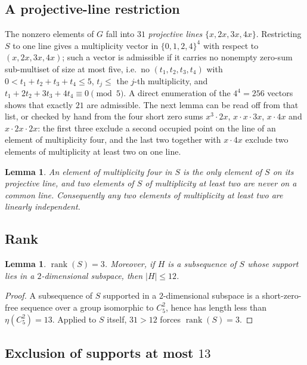 \documentclass[11pt]{article}
\newtheorem{lemma}[theorem]{Lemma}
\theoremstyle{definition}
\theoremstyle{remark}
\newcommand{\rank}{\operatorname{rank}}
\begin{document}
\subsection{A projective-line restriction}

The nonzero elements of $G$ fall into $31$ \emph{projective lines} $\{x,2x,3x,4x\}$. Restricting $S$ to one line gives a multiplicity vector in $\{0,1,2,4\}^4$ with respect to $(x,2x,3x,4x)$; such a vector is admissible if it carries no nonempty zero-sum sub-multiset of size at most five, i.e.\ no $(t_1,t_2,t_3,t_4)$ with $0<t_1+t_2+t_3+t_4\le5$, $t_j\le$ the $j$-th multiplicity, and $t_1+2t_2+3t_3+4t_4\equiv0\pmod5$. A direct enumeration of the $4^4=256$ vectors shows that exactly $21$ are admissible. The next lemma can be read off from that list, or checked by hand from the four short zero sums $x^3\cdot2x$, $x\cdot x\cdot3x$, $x\cdot4x$ and $x\cdot2x\cdot2x$: the first three exclude a second occupied point on the line of an element of multiplicity four, and the last two together with $x\cdot4x$ exclude two elements of multiplicity at least two on one line.

\begin{lemma}\label{lem:line}
An element of multiplicity four in $S$ is the only element of $S$ on its projective line, and two elements of $S$ of multiplicity at least two are never on a common line. Consequently any two elements of multiplicity at least two are linearly independent.
\end{lemma}

\subsection{Rank}

\begin{lemma}\label{lem:rank}
$\rank(S)=3$. Moreover, if $H$ is a subsequence of $S$ whose support lies in a $2$-dimensional subspace, then $|H|\le12$.
\end{lemma}

\begin{proof}
A subsequence of $S$ supported in a $2$-dimensional subspace is a short-zero-free sequence over a group isomorphic to $C_5^2$, hence has length less than $\eta(C_5^2)=13$. Applied to $S$ itself, $31>12$ forces $\rank(S)=3$.
\end{proof}

\subsection{Exclusion of supports at most $13$}
\end{document}
